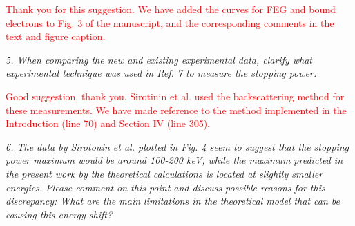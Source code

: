 \documentclass[a4paper,10pt]{article}
\def\reviewer#1{\vspace{0.35cm}\textsl{#1}}
\def\reply#1{\vspace{0.1cm}\textcolor{red}{#1}}
\begin{document}
\reply{Thank you for this suggestion. We have added the curves for FEG and bound electrons to Fig. 3 of the manuscript, and the corresponding comments in the text and figure caption.}

\reviewer{
5. When comparing the new and existing experimental data, clarify what
experimental technique was used in Ref. 7 to measure the stopping
power.}

\reply{Good suggestion, thank you. Sirotinin et al. used the 
backscattering method for these measurements. We have made reference to 
the method implemented in the Introduction (line 70) and Section IV 
(line 305).}

\reviewer{
6. The data by Sirotonin et al. plotted in Fig. 4 seem to suggest that
the stopping power maximum would be around 100-200 keV, while the
maximum predicted in the present work by the theoretical calculations
is located at slightly smaller energies. Please comment on this point
and discuss possible reasons for this discrepancy: What are the main
limitations in the theoretical model that can be causing this energy
shift?}
\end{document}
